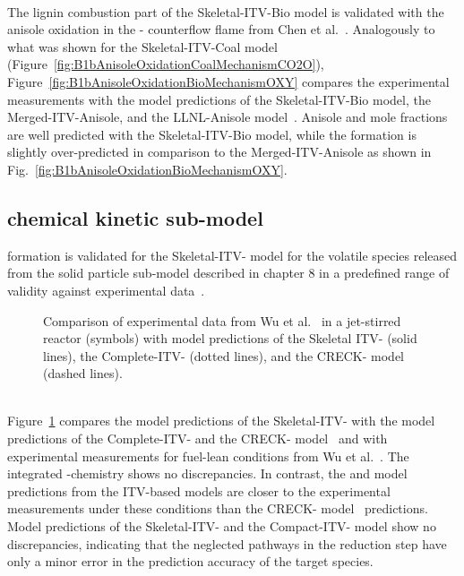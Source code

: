 \begin{refsection}
\\
The lignin combustion part of the Skeletal-ITV-Bio model is validated with the anisole oxidation in the - counterflow flame from Chen et al.~\cite{Chen2022}. Analogously to what was shown for the Skeletal-ITV-Coal model (Figure~\ref{fig:B1bAnisoleOxidationCoalMechanismCO2O}), Figure~\ref{fig:B1bAnisoleOxidationBioMechanismOXY} compares the experimental measurements with the model predictions of the Skeletal-ITV-Bio model, the Merged-ITV-Anisole, and the LLNL-Anisole model~\cite{Wagnon2018}. Anisole and  mole fractions are well predicted with the Skeletal-ITV-Bio model, while the  formation is slightly over-predicted in comparison to the Merged-ITV-Anisole as shown in Fig.~\ref{fig:B1bAnisoleOxidationBioMechanismOXY}.


\subsection{ chemical kinetic sub-model}

 formation is validated for the Skeletal-ITV- model for the volatile species released from the solid particle sub-model described in chapter 8 in a predefined range of validity against experimental data~\cite{Wu2022}.
\begin{figure}[t]
  \centering
  \hfill
  \hfill
  \caption{Comparison of experimental data from Wu et al.~\cite{Wu2022} in a jet-stirred reactor (symbols) with model predictions of the Skeletal ITV- (solid lines), the Complete-ITV- (dotted lines), and the CRECK- model~\cite{Shamooni2021} (dashed lines).}
  \label{fig:B1bNOxWuValidation}
\end{figure}
\\
Figure~\ref{fig:B1bNOxWuValidation} compares the model predictions of the Skeletal-ITV- with the model predictions of the Complete-ITV- and the CRECK- model~\cite{Shamooni2021} and with experimental measurements for fuel-lean conditions from Wu et al.~\cite{Wu2022}. The integrated -chemistry shows no discrepancies. In contrast, the  and  model predictions from the ITV-based models are closer to the experimental measurements under these conditions than the CRECK- model~\cite{Shamooni2021} predictions. Model predictions of the Skeletal-ITV- and the Compact-ITV- model show no discrepancies, indicating that the neglected pathways in the reduction step have only a minor error in the prediction accuracy of the target species.


\end{refsection}

